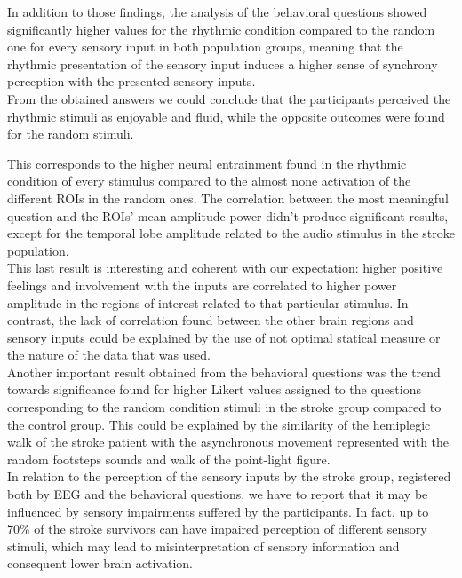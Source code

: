 In addition to those findings, the analysis of the behavioral questions showed significantly higher values for the rhythmic condition compared to the random one for every sensory input in both population groups, meaning that the rhythmic presentation of the sensory input induces a higher sense of synchrony perception with the presented sensory inputs. \\
From the obtained answers we could conclude that the participants perceived the rhythmic stimuli as enjoyable and fluid, while the opposite outcomes were found for the random stimuli. 

This corresponds to the higher neural entrainment found in the rhythmic condition of every stimulus compared to the almost none activation of the different ROIs in the random ones. The correlation between the most meaningful question and the ROIs' mean amplitude power didn't produce significant results, except for the temporal lobe amplitude related to the audio stimulus in the stroke population. \\
This last result is interesting and coherent with our expectation: higher positive feelings and involvement with the inputs are correlated to higher power amplitude in the regions of interest related to that particular stimulus. In contrast, the lack of correlation found between the other brain regions and sensory inputs could be explained by the use of not optimal statical measure or the nature of the data that was used.\\
Another important result obtained from the behavioral questions was the trend towards significance found for higher Likert values assigned to the questions corresponding to the random condition stimuli in the stroke group compared to the control group. This could be explained by the similarity of the hemiplegic walk of the stroke patient with the asynchronous movement represented with the random footsteps sounds and walk of the point-light figure. \\
In relation to the perception of the sensory inputs by the stroke group, registered both by EEG and the behavioral questions, we have to report that it may be influenced by sensory impairments suffered by the participants. In fact, up to 70\% of the stroke survivors can have impaired perception of different sensory stimuli, which may lead to misinterpretation of sensory information \parencite{Hazelton_2022} and consequent lower brain activation. 

